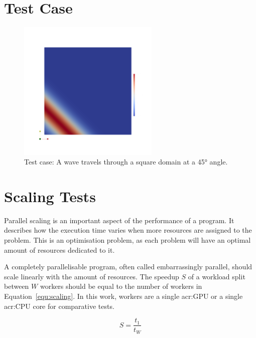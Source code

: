\section{Test Case}\label{section:results:test_case}

\begin{figure}[H]
	\centering
	\includegraphics[width=0.6\textwidth]{Chapter_results/media/problem_1}
	\caption{Test case: A wave travels through a square domain at a 45° angle.}\label{fig:problem}
\end{figure}

\section{Scaling Tests}\label{section:results:scaling_tests}

Parallel scaling is an important aspect of the performance of a program. It describes how the
execution time varies when more resources are assigned to the problem. This is an optimisation
problem, as each problem will have an optimal amount of resources dedicated to it. 

A completely parallelisable program, often called embarrassingly parallel, should scale linearly
with the amount of resources. The speedup \(S\) of a workload split between \(W\) workers should be
equal to the number of workers in Equation~\ref{equ:scaling}. In this work, workers are a single
\acrshort{acr:GPU} or a single \acrshort{acr:CPU} core for comparative tests.

\begin{equation} \label{equ:scaling}
	S = \frac{t_1}{t_W}
\end{equation}

